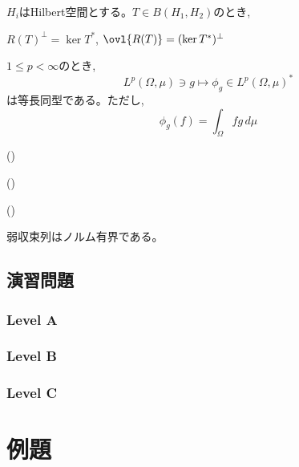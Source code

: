 \begin{theo}
$H_i$はHilbert空間とする。$T\in B(H_1,H_2)$のとき, 
\ben
\item $R(T)^{\bot} = \ker{T^{\ast}}$, $\ovl{R(T)} = (\ker{T^{\ast}})^{\bot}$
\een
\end{theo}

\begin{theo} 
$1\leq p<\infty$のとき, 
\[L^{p}(\Omega,\mu) \ni g \mapsto  \phi_{g}\in L^{p}(\Omega,\mu)^{\ast}\]
は等長同型である。ただし, 
\[\phi_g(f) = \int_{\Omega} fg\, d\mu\]
\end{theo}

\begin{theo} ()

\end{theo}

\begin{theo} ()

\end{theo}

\begin{theo} ()

\end{theo}

\begin{cor} 
弱収束列はノルム有界である。
\end{cor}



\subsection{演習問題}

\subsubsection{Level A}
\subsubsection{Level B}
\subsubsection{Level C}

\section{例題}

